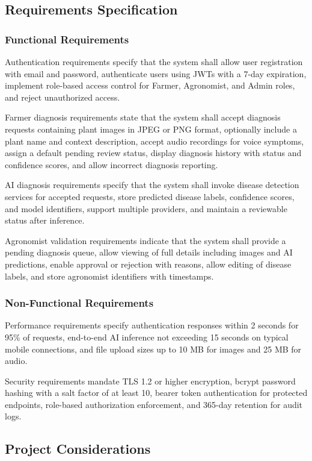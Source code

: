 \documentclass[12pt]{article}
\begin{document}
\subsection{Requirements Specification}

\subsubsection{Functional Requirements}
Authentication requirements specify that the system shall allow user registration with email and password, authenticate users using JWTs with a 7-day expiration, implement role-based access control for Farmer, Agronomist, and Admin roles, and reject unauthorized access.

Farmer diagnosis requirements state that the system shall accept diagnosis requests containing plant images in JPEG or PNG format, optionally include a plant name and context description, accept audio recordings for voice symptoms, assign a default pending review status, display diagnosis history with status and confidence scores, and allow incorrect diagnosis reporting.

AI diagnosis requirements specify that the system shall invoke disease detection services for accepted requests, store predicted disease labels, confidence scores, and model identifiers, support multiple providers, and maintain a reviewable status after inference.

Agronomist validation requirements indicate that the system shall provide a pending diagnosis queue, allow viewing of full details including images and AI predictions, enable approval or rejection with reasons, allow editing of disease labels, and store agronomist identifiers with timestamps.

\subsubsection{Non-Functional Requirements}
Performance requirements specify authentication responses within 2 seconds for 95\% of requests, end-to-end AI inference not exceeding 15 seconds on typical mobile connections, and file upload sizes up to 10 MB for images and 25 MB for audio.

Security requirements mandate TLS 1.2 or higher encryption, bcrypt password hashing with a salt factor of at least 10, bearer token authentication for protected endpoints, role-based authorization enforcement, and 365-day retention for audit logs.

\subsection{Project Considerations}
\end{document}
